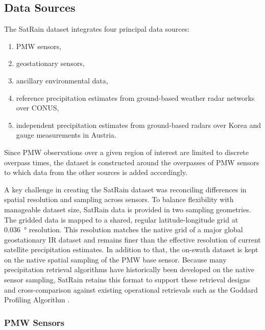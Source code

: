 \documentclass[11pt]{article}
\begin{document}
\subsection{Data Sources}

The SatRain dataset integrates four principal data sources:

\begin{enumerate}
  \item PMW sensors,
  \item geostationary sensors,
  \item ancillary environmental data,
  \item reference precipitation estimates from ground-based weather radar networks over CONUS,
  \item independent precipitation estimates from ground-based radars over Korea and gauge measurements in Austria.
\end{enumerate}

Since PMW observations over a given region of interest are limited to discrete
overpass times, the dataset is constructed around the overpasses of PMW sensors
to which data from the other sources is added accordingly.

A key challenge in creating the SatRain dataset was reconciling differences in
spatial resolution and sampling across sensors. To balance flexibility with
manageable dataset size, SatRain data is provided in two sampling geometries.
The gridded data is mapped to a shared, regular latitude-longitude grid at
\SI{0.036}{\degree} resolution. This resolution matches the native grid of a
major global geostationary IR dataset \citep{NCEP_CPC_L3_IR} and remains finer
than the effective resolution of current satellite precipitation estimates. In
addition to that, the on-swath dataset is kept on the native spatial sampling of
the PMW base sensor. Because many precipitation retrieval algorithms have
historically been developed on the native sensor sampling, SatRain retains this
format to support these retrieval designs and cross-comparison against existing
operational retrievals such as the Goddard Profiling Algorithm
\citep{Kummerow2015GPROF}.

\subsubsection{PMW Sensors}
\end{document}
